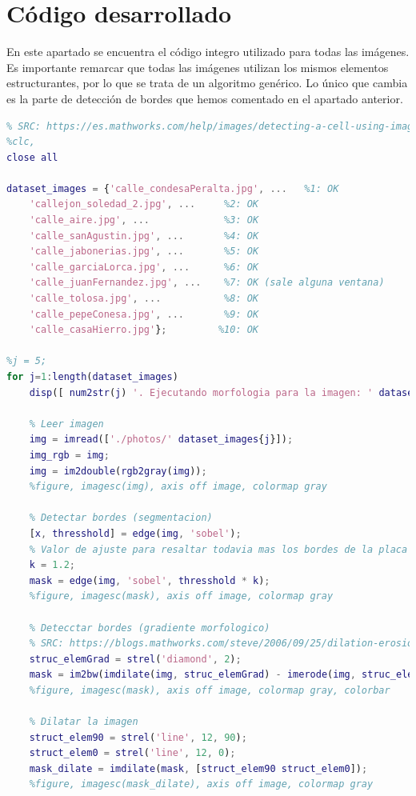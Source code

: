 \documentclass[12pt]{article}
\begin{document}
	\pagebreak
	
\section{Código desarrollado}
\noindent En este apartado se encuentra el código integro utilizado para todas las imágenes. Es importante remarcar que todas las imágenes utilizan los mismos elementos estructurantes, por lo que se trata de un algoritmo genérico. Lo único que cambia es la parte de detección de bordes que hemos comentado en el apartado anterior.

\begin{lstlisting}[language=matlab, caption={Código implementado para segmentación y OCR de carteles de calles, utilizando morfología matemática}]
%% Detectar placas de calles
% SRC: https://es.mathworks.com/help/images/detecting-a-cell-using-image-segmentation.html
%clc,
close all

dataset_images = {'calle_condesaPeralta.jpg', ...   %1: OK
	'callejon_soledad_2.jpg', ...     %2: OK
	'calle_aire.jpg', ...             %3: OK
	'calle_sanAgustin.jpg', ...       %4: OK 
	'calle_jabonerias.jpg', ...       %5: OK
	'calle_garciaLorca.jpg', ...      %6: OK
	'calle_juanFernandez.jpg', ...    %7: OK (sale alguna ventana)
	'calle_tolosa.jpg', ...           %8: OK
	'calle_pepeConesa.jpg', ...       %9: OK
	'calle_casaHierro.jpg'};         %10: OK

%j = 5;
for j=1:length(dataset_images) 
	disp([ num2str(j) '. Ejecutando morfologia para la imagen: ' dataset_images{j}])

	% Leer imagen
	img = imread(['./photos/' dataset_images{j}]);
	img_rgb = img;
	img = im2double(rgb2gray(img));
	%figure, imagesc(img), axis off image, colormap gray

	% Detectar bordes (segmentacion)
	[x, thresshold] = edge(img, 'sobel');
	% Valor de ajuste para resaltar todavia mas los bordes de la placa
	k = 1.2;  
	mask = edge(img, 'sobel', thresshold * k);
	%figure, imagesc(mask), axis off image, colormap gray

	% Detecctar bordes (gradiente morfologico)
	% SRC: https://blogs.mathworks.com/steve/2006/09/25/dilation-erosion-and-the-morphological-gradient/
	struc_elemGrad = strel('diamond', 2);
	mask = im2bw(imdilate(img, struc_elemGrad) - imerode(img, struc_elemGrad));
	%figure, imagesc(mask), axis off image, colormap gray, colorbar

	% Dilatar la imagen
	struct_elem90 = strel('line', 12, 90);
	struct_elem0 = strel('line', 12, 0);
	mask_dilate = imdilate(mask, [struct_elem90 struct_elem0]);
	%figure, imagesc(mask_dilate), axis off image, colormap gray


\end{lstlisting}
\end{document}
